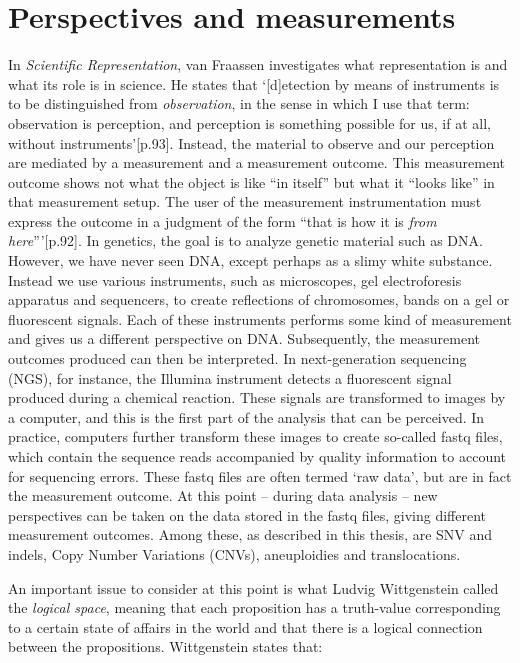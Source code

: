 \section{Perspectives and measurements} \label{Perspectives}
In \textsl{Scientific Representation}, van Fraassen investigates what representation is and what its role is in science. 
He states that ‘[d]etection by means of instruments is to be distinguished from \textsl{observation}, in the sense in which I use that term: observation is perception, and perception is something possible for us, if at all, without instruments’[p.93]. 
Instead, the material to observe and our perception are mediated by a measurement and a measurement outcome. 
This measurement outcome shows not what the object is like “in itself” but what it “looks like” in that measurement setup. 
The user of the measurement instrumentation must express the outcome in a judgment of the form “that is how it is \textsl{from here}”’[p.92]. 
In genetics, the goal is to analyze genetic material such as DNA. 
However, we have never seen DNA, except perhaps as a slimy white substance. 
Instead we use various instruments, such as microscopes, gel electroforesis apparatus and sequencers, to create reflections of chromosomes, bands on a gel or fluorescent signals. 
Each of these instruments performs some kind of measurement and gives us a different perspective on DNA. 
Subsequently, the measurement outcomes produced can then be interpreted. 
In next-generation sequencing (NGS), for instance, the Illumina instrument detects a fluorescent signal produced during a chemical reaction. 
These signals are transformed to images by a computer, and this is the first part of the analysis that can be perceived. 
In practice, computers further transform these images to create so-called fastq files, which contain the sequence reads accompanied by quality information to account for sequencing errors. 
These fastq files are often termed ‘raw data’, but are in fact the measurement outcome. 
At this point – during data analysis – new perspectives can be taken on the data stored in the fastq files, giving different measurement outcomes.
Among these, as described in this thesis, are SNV and indels, Copy Number Variations (CNVs), aneuploidies and translocations. 

An important issue to consider at this point is what Ludvig Wittgenstein called the \textsl{logical space}, meaning that each proposition has a truth-value corresponding to a certain state of affairs in the world and that there is a logical connection between the propositions. 
Wittgenstein states that: \newline


